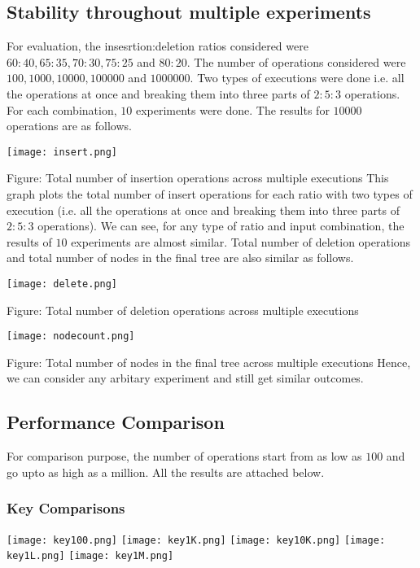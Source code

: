 \documentclass{article}
\begin{document}
\subsection{Stability throughout multiple experiments}
For evaluation, the insesrtion:deletion ratios considered were $60:40,65:35,70:30,75:25$ and $80:20$. The number of operations considered were $100,1000,10000,100000$ and $1000000$. Two types of executions were done i.e. all the operations at once and breaking them into three parts of $2:5:3$ operations. For each combination, $10$ experiments were done. The results for $10000$ operations are as follows.\newline
\begin{center}
\texttt{[image: insert.png]}
\end{center}
Figure: Total number of insertion operations across multiple executions\newline\newline
This graph plots the total number of insert operations for each ratio with two types of execution (i.e. all the operations at once and breaking them into three parts of $2:5:3$ operations). We can see, for any type of ratio and input combination, the results of $10$ experiments are almost similar. Total number of deletion operations and total number of nodes in the final tree are also similar as follows.
\begin{center}
\texttt{[image: delete.png]}
\end{center}
Figure: Total number of deletion operations across multiple executions
\begin{center}
\texttt{[image: nodecount.png]}
\end{center}
Figure: Total number of nodes in the final tree across multiple executions\newline\newline
Hence, we can consider any arbitary experiment and still get similar outcomes.

\subsection{Performance Comparison}
For comparison purpose, the number of operations start from as low as $100$ and go upto as high as a million. All the results are attached below.
\subsubsection{Key Comparisons}
\begin{center}
\texttt{[image: key100.png]}
\texttt{[image: key1K.png]}
\texttt{[image: key10K.png]}
\texttt{[image: key1L.png]}
\texttt{[image: key1M.png]}
\end{center}
\end{document}
